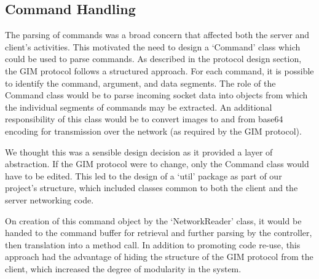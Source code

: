 \subsection {Command Handling}

The parsing of commands was a broad concern that affected both the server and client's activities. This motivated the need to design a `Command' class which could be used to parse commands. As described in the protocol design section, the GIM protocol follows a structured approach. For each command, it is possible to identify the command, argument, and data segments. The role of the Command class would be to parse incoming socket data into objects from which the individual segments of commands may be extracted. An additional responsibility of this class would be to convert images to and from base64 encoding for transmission over the network (as required by the GIM protocol).

We thought this was a sensible design decision as it provided a layer of abstraction. If the GIM protocol were to change, only the Command class would have to be edited. This led to the design of a `util' package as part of our project's structure, which included classes common to both the client and the server networking code. 

On creation of this command object by the `NetworkReader' class, it would be handed to the command buffer for retrieval and further parsing by the controller, then translation into a method call. In addition to promoting code re-use, this approach had the advantage of hiding the structure of the GIM protocol from the client, which increased the degree of modularity in the system.   

